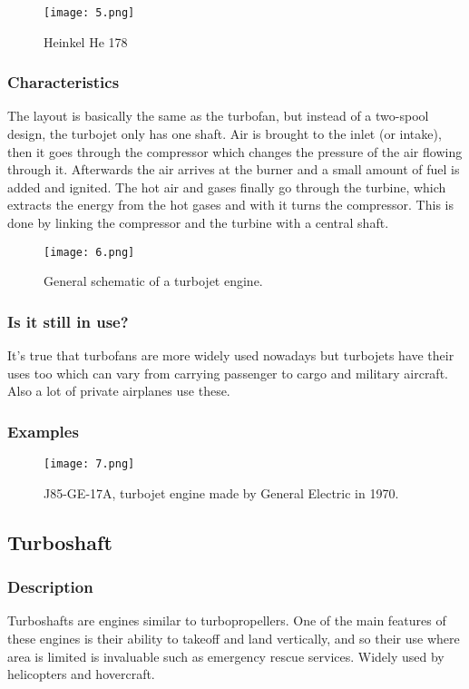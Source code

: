\documentclass[12pt, letterpaper]{article}
\begin{document}
\begin{figure}[H]
	\centering
	\texttt{[image: 5.png]}
	\caption{Heinkel He 178}
\end{figure}
\subsubsection*{Characteristics}
The layout is basically the same as the turbofan, but instead of a two-spool design, the turbojet only has one shaft. Air is brought to the inlet (or intake), then it goes through the compressor which changes the pressure of the air flowing through it. Afterwards the air arrives at the burner and a small amount of fuel is added and ignited. The hot air and gases finally go through the turbine, which extracts the energy from the hot gases and with it turns the compressor. This is done by linking the compressor and the turbine with a central shaft.\autocite{nasa02}
\begin{figure}[H]
	\centering
	\texttt{[image: 6.png]}
	\caption{General schematic of a turbojet engine.}
\end{figure}
\subsubsection*{Is it still in use?}
It's true that turbofans are more widely used nowadays but turbojets have their uses too which can vary from carrying passenger to cargo and military aircraft. Also a lot of private airplanes use these.
\subsubsection*{Examples}
\begin{figure}[H]
	\centering
	\texttt{[image: 7.png]}
	\caption{J85-GE-17A, turbojet engine made by General Electric in 1970.}
\end{figure}

\subsection*{Turboshaft}

\subsubsection*{Description}
Turboshafts are engines similar to turbopropellers. One of the main features of these engines is their ability to takeoff and land vertically, and so their use where area is limited is invaluable such as emergency rescue services. Widely used by helicopters and hovercraft.\autocite{pbs00}
\end{document}
